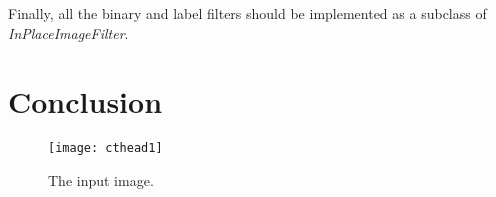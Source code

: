 \documentclass{InsightArticle}
\begin{document}
Finally, all the binary and label filters should be implemented as a subclass of {\em InPlaceImageFilter}.

\section{Conclusion}







\begin{figure}[htbp]
\centering
\texttt{[image: cthead1]}
\caption{The input image.\label{cthead1}}
\end{figure}


\appendix





\nocite{ITKSoftwareGuide}
\end{document}

